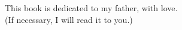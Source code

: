 \frontmatter

This book is dedicated to my father, with love.\\
(If necessary, I will read it to you.)
